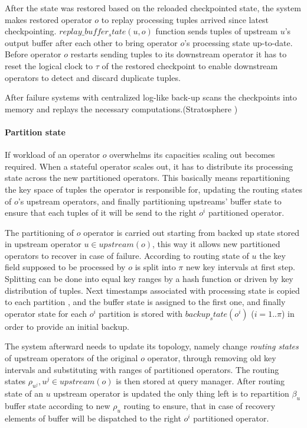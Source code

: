  After the state was restored based on the reloaded checkpointed state, the system makes restored operator $o$ to replay processing tuples arrived since latest checkpointing. $replay\_buffer_state(u,o)$ function sends tuples of upstream $u$'s output buffer after each other to bring operator $o$'s processing state up-to-date. Before operator  $o$ restarts sending tuples to its downstream operator it has to reset the logical clock to $\tau$ of the restored checkpoint to enable downstream operators to detect and discard duplicate tuples.

After failure systems with centralized log-like back-up scans the checkpoints into memory and replays the necessary computations.(Stratosphere ) 
 
\paragraph{Partition state}
If workload of an operator $o$ overwhelms its capacities scaling out becomes required. When a stateful operator scales out, it has to distribute its processing state across the new partitioned operators. This basically means  repartitioning  the key space of tuples the operator is responsible for, updating the routing states of $o$'s upstream operators, and finally partitioning upstreams' buffer state to ensure that each tuples of it will be send to the right $o^i$ partitioned operator.

The partitioning of $o$ operator is carried out starting from backed up state stored in upstream operator $u \in upstream(o)$, this way it allows new partitioned operators to recover in case of failure. According to routing state of $u$ the key field supposed to be processed by $o$ is split into $\pi$ new key intervals at first step. Splitting can be done into equal key ranges by a hash function or driven by key distribution of tuples. Next timestamps associated with processing state is copied to each partition , and the buffer state is assigned to the first one, and finally operator state for each $o^i $ partition is stored with $backup_state(o^i)$ ($i = 1..\pi$) in order to provide an initial backup.  

The system afterward needs to update its topology, namely change  \textit{routing states} of upstream operators of the original $o$ operator, through removing old key intervals and substituting with ranges of partitioned operators. The routing states $\rho_{u^j}, u^j \in upstream(o) $ is then stored at query manager. After routing state of an $u$ upstream operator is updated the only thing left is to repartition $\beta_u$ buffer state according to new $\rho_u$ routing to ensure, that in case of recovery elements of buffer will be dispatched to the right $o^i$ partitioned operator.
  
